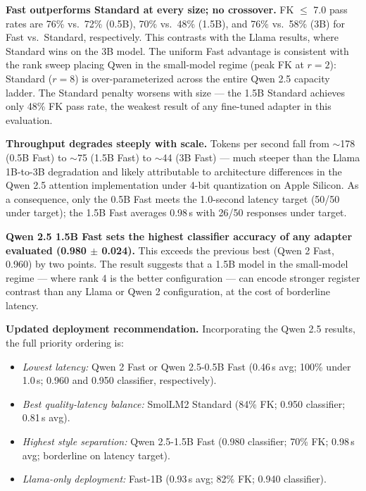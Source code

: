 \documentclass[AMA,Times1COL]{WileyNJDv5} %
\begin{document}
\textbf{Fast outperforms Standard at every size; no crossover.} FK $\leq$ 7.0 pass rates are 76\% vs.\ 72\% (0.5B), 70\% vs.\ 48\% (1.5B), and 76\% vs.\ 58\% (3B) for Fast vs.\ Standard, respectively. This contrasts with the Llama results, where Standard wins on the 3B model. The uniform Fast advantage is consistent with the rank sweep placing Qwen in the small-model regime (peak FK at $r=2$): Standard ($r=8$) is over-parameterized across the entire Qwen 2.5 capacity ladder. The Standard penalty worsens with size --- the 1.5B Standard achieves only 48\% FK pass rate, the weakest result of any fine-tuned adapter in this evaluation.

\textbf{Throughput degrades steeply with scale.} Tokens per second fall from $\sim$178 (0.5B Fast) to $\sim$75 (1.5B Fast) to $\sim$44 (3B Fast) --- much steeper than the Llama 1B-to-3B degradation and likely attributable to architecture differences in the Qwen 2.5 attention implementation under 4-bit quantization on Apple Silicon. As a consequence, only the 0.5B Fast meets the 1.0-second latency target (50/50 under target); the 1.5B Fast averages 0.98\,s with 26/50 responses under target.

\textbf{Qwen 2.5 1.5B Fast sets the highest classifier accuracy of any adapter evaluated (0.980 $\pm$ 0.024).} This exceeds the previous best (Qwen 2 Fast, 0.960) by two points. The result suggests that a 1.5B model in the small-model regime --- where rank 4 is the better configuration --- can encode stronger register contrast than any Llama or Qwen 2 configuration, at the cost of borderline latency.

\textbf{Updated deployment recommendation.} Incorporating the Qwen 2.5 results, the full priority ordering is:
\begin{itemize}
    \item \textit{Lowest latency:} Qwen 2 Fast or Qwen 2.5-0.5B Fast (0.46\,s avg; 100\% under 1.0\,s; 0.960 and 0.950 classifier, respectively).
    \item \textit{Best quality-latency balance:} SmolLM2 Standard (84\% FK; 0.950 classifier; 0.81\,s avg).
    \item \textit{Highest style separation:} Qwen 2.5-1.5B Fast (0.980 classifier; 70\% FK; 0.98\,s avg; borderline on latency target).
    \item \textit{Llama-only deployment:} Fast-1B (0.93\,s avg; 82\% FK; 0.940 classifier).
\end{itemize}
\end{document}
